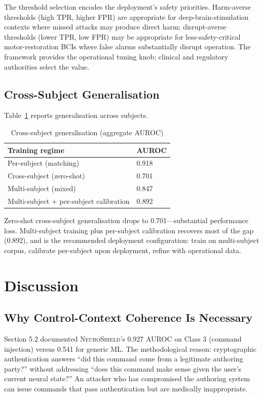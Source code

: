 \documentclass[sigconf,nonacm]{acmart}
\begin{document}
The threshold selection encodes the deployment's safety priorities.
Harm-averse thresholds (high TPR, higher FPR) are appropriate for
deep-brain-stimulation contexts where missed attacks may produce
direct harm; disrupt-averse thresholds (lower TPR, low FPR) may be
appropriate for less-safety-critical motor-restoration BCIs where
false alarms substantially disrupt operation. The framework
provides the operational tuning knob; clinical and regulatory
authorities select the value.

\subsection{Cross-Subject Generalisation}

Table~\ref{tab:crossubject} reports generalisation across subjects.

\begin{table}[h]
\caption{Cross-subject generalisation (aggregate AUROC)}
\label{tab:crossubject}
\small
\begin{tabularx}{\columnwidth}{@{}p{3.2cm}X@{}}
\toprule
\textbf{Training regime} & \textbf{AUROC} \\
\midrule
Per-subject (matching)   & 0.918 \\
Cross-subject (zero-shot) & 0.701 \\
Multi-subject (mixed)    & 0.847 \\
Multi-subject + per-subject calibration & 0.892 \\
\bottomrule
\end{tabularx}
\end{table}

Zero-shot cross-subject generalisation drops to 0.701---substantial
performance loss. Multi-subject training plus per-subject
calibration recovers most of the gap (0.892), and is the
recommended deployment configuration: train on multi-subject
corpus, calibrate per-subject upon deployment, refine with
operational data.

\section{Discussion}

\subsection{Why Control-Context Coherence Is Necessary}

Section 5.2 documented \textsc{NeuroShield}'s 0.927 AUROC on Class
3 (command injection) versus 0.541 for generic ML. The
methodological reason: cryptographic authentication answers
``did this command come from a legitimate authoring party?''
without addressing ``does this command make sense given the
user's current neural state?'' An attacker who has compromised the
authoring system can issue commands that pass authentication but
are medically inappropriate.
\end{document}
